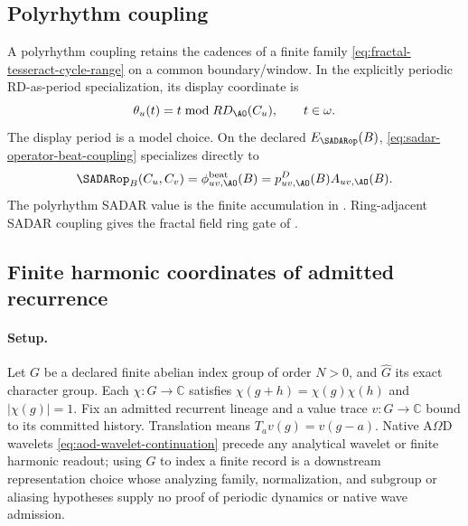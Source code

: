 \subsection{Polyrhythm coupling}
\label{subsec:polyrhythm-coupling}
A polyrhythm coupling retains the cadences of a finite family
\eqref{eq:fractal-tesseract-cycle-range} on a common boundary/window.
In the explicitly periodic RD-as-period specialization, its display coordinate is
\begin{equation}
\theta_u(t)=t\bmod RD_{\AO}(C_u),
\qquad t\in\omega.
\label{eq:polyrhythm-phase-coordinate}
\end{equation}
The display period is a model choice. On the declared \(E_{\SADARop}(B)\),
\eqref{eq:sadar-operator-beat-coupling} specializes directly to
\begin{equation}
\SADARop_B(C_u,C_v)
=
\phi^{\mathrm{beat}}_{uv,\AO}(B)
=
p^D_{uv,\AO}(B)A_{uv,\AO}(B).
\label{eq:polyrhythm-sadar-coupling}
\end{equation}
The polyrhythm SADAR value is the finite accumulation in . Ring-adjacent SADAR coupling gives the fractal field ring gate of .


\subsection{Finite harmonic coordinates of admitted recurrence}
\label{sec:finite-harmonics}
\paragraph{Setup.}
Let \(G\) be a declared finite abelian index group of order \(N>0\), and
\(\widehat G\) its exact character group. Each \(\chi:G\to\mathbb C\)
satisfies \(\chi(g+h)=\chi(g)\chi(h)\) and \(|\chi(g)|=1\).
Fix an admitted recurrent lineage and a value trace \(v:G\to\mathbb C\)
bound to its committed history. Translation means \(T_a v(g)=v(g-a)\).
Native A\(\Omega\)D wavelets \eqref{eq:aod-wavelet-continuation} precede any
analytical wavelet or finite harmonic readout; using \(G\) to index a finite
record is a downstream representation choice whose analyzing family,
normalization, and subgroup or aliasing hypotheses supply no proof of periodic
dynamics or native wave admission.

